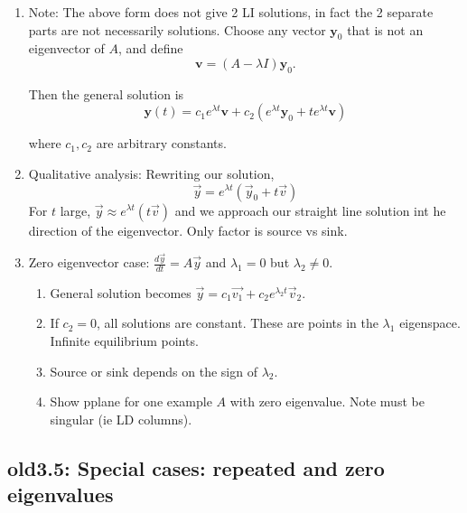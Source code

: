 \documentclass{article}
\begin{document}
\begin{enumerate}
\item Note: The above form does not give 2 LI solutions, in fact the 2 separate parts are not necessarily solutions. Choose any vector \(\mathbf y_0\) that is not an eigenvector of \(A\), and define
\[
\mathbf v=(A-\lambda I)\mathbf y_0.
\]

Then the general solution is
\[
\boxed{
\mathbf y(t)=
c_1e^{\lambda t}\mathbf v+
c_2\left(e^{\lambda t}\mathbf y_0+
te^{\lambda t}\mathbf v\right)
}
\]

where \(c_1,c_2\) are arbitrary constants.

\item Qualitative analysis: Rewriting our solution,
\[
\vec{y} = e^{\lambda t} (\vec{y}_0 + t\vec{v})
\]
For $t$ large, $\vec{y} \approx e^{\lambda t} (t\vec{v})$ and we approach our straight line solution int he direction of the eigenvector. Only factor is source vs sink.

\item Zero eigenvector case: $\frac{d \vec{y}}{dt} = A\vec{y}$ and $\lambda_1=0$ but $\lambda_2 \neq 0$.
\begin{enumerate}
\item General solution becomes $\vec{y} = c_1 \vec{v_1} + c_2 e^{\lambda_2 t} \vec{v}_2$.
\item If $c_2=0$, all solutions are constant. These are points in the $\lambda_1$ eigenspace. Infinite equilibrium points.
\item Source or sink depends on the sign of $\lambda_2$.
\item Show pplane for one example $A$ with zero eigenvalue. Note must be singular (ie LD columns).
\end{enumerate}
\end{enumerate}

\subsection{old3.5: Special cases: repeated and zero eigenvalues}
\end{document}
